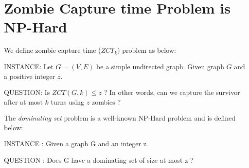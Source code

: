 \documentclass[1p]{elsarticle}
\begin{document}
\section{Zombie Capture time Problem is NP-Hard}\label{np-capturetime}
	We define zombie capture time ($ZCT_k$) problem as below:


	INSTANCE: Let $G = (V,E)$ be a simple undirected graph. Given graph $G$ and a positive integer $z$.


	QUESTION: Is $ZCT(G,k) \leq z$ ? In other words, can we capture the survivor after at most $k$ turns using $z$ zombies ?

	The {\it dominating set} problem is a well-known NP-Hard problem and is defined below:

	INSTANCE : Given a graph G and an integer z.

	QUESTION : Does G have a dominating set of size at most z ?
\end{document}
